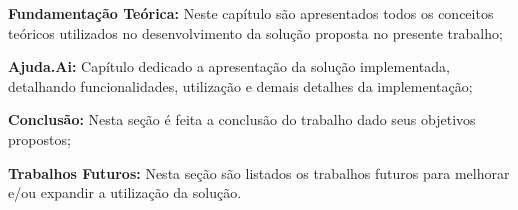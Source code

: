 \begin{lista}
  \item \textbf{Fundamentação Teórica:} Neste capítulo são apresentados todos os conceitos teóricos utilizados no desenvolvimento da solução proposta no presente trabalho;
  \item \textbf{Ajuda.Ai:} Capítulo dedicado a apresentação da solução implementada, detalhando funcionalidades, utilização e demais detalhes da implementação;
  \item \textbf{Conclusão:} Nesta seção é feita a conclusão do trabalho dado seus objetivos propostos;
  \item \textbf{Trabalhos Futuros:} Nesta seção são listados os trabalhos futuros para melhorar e/ou expandir a utilização da solução.
\end{lista}